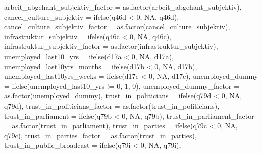 \documentclass[
]{article}
\newenvironment{Shaded}{\begin{snugshade}}{\end{snugshade}}
\newcommand{\AttributeTok}[1]{\textcolor[rgb]{0.77,0.63,0.00}{#1}}
\newcommand{\ConstantTok}[1]{\textcolor[rgb]{0.00,0.00,0.00}{#1}}
\newcommand{\DecValTok}[1]{\textcolor[rgb]{0.00,0.00,0.81}{#1}}
\newcommand{\FunctionTok}[1]{\textcolor[rgb]{0.00,0.00,0.00}{#1}}
\newcommand{\NormalTok}[1]{#1}
\newcommand{\SpecialCharTok}[1]{\textcolor[rgb]{0.00,0.00,0.00}{#1}}
\begin{document}
\begin{Shaded}
\begin{Highlighting}[]
         \AttributeTok{arbeit\_abgehant\_subjektiv\_factor =} \FunctionTok{as.factor}\NormalTok{(arbeit\_abgehant\_subjektiv),}
         \AttributeTok{cancel\_culture\_subjektiv =} \FunctionTok{ifelse}\NormalTok{(q46d }\SpecialCharTok{\textless{}} \DecValTok{0}\NormalTok{, }\ConstantTok{NA}\NormalTok{, q46d),}
         \AttributeTok{cancel\_culture\_subjektiv\_factor =} \FunctionTok{as.factor}\NormalTok{(cancel\_culture\_subjektiv),}
         \AttributeTok{infrastruktur\_subjektiv =} \FunctionTok{ifelse}\NormalTok{(q46c }\SpecialCharTok{\textless{}} \DecValTok{0}\NormalTok{, }\ConstantTok{NA}\NormalTok{, q46c),}
         \AttributeTok{infrastruktur\_subjektiv\_factor =} \FunctionTok{as.factor}\NormalTok{(infrastruktur\_subjektiv),}
         \AttributeTok{unemployed\_last10\_yrs =} \FunctionTok{ifelse}\NormalTok{(d17a }\SpecialCharTok{\textless{}} \DecValTok{0}\NormalTok{, }\ConstantTok{NA}\NormalTok{, d17a),}
         \AttributeTok{unemployed\_last10yrs\_months =} \FunctionTok{ifelse}\NormalTok{(d17b }\SpecialCharTok{\textless{}} \DecValTok{0}\NormalTok{, }\ConstantTok{NA}\NormalTok{, d17b),}
         \AttributeTok{unemployed\_last10yrs\_weeks =} \FunctionTok{ifelse}\NormalTok{(d17c }\SpecialCharTok{\textless{}} \DecValTok{0}\NormalTok{, }\ConstantTok{NA}\NormalTok{, d17c),}
         \AttributeTok{unemployed\_dummy =} \FunctionTok{ifelse}\NormalTok{(unemployed\_last10\_yrs }\SpecialCharTok{!=} \DecValTok{0}\NormalTok{, }\DecValTok{1}\NormalTok{, }\DecValTok{0}\NormalTok{),}
         \AttributeTok{unemployed\_dummy\_factor =} \FunctionTok{as.factor}\NormalTok{(unemployed\_dummy),}
         \AttributeTok{trust\_in\_politicians =} \FunctionTok{ifelse}\NormalTok{(q79d }\SpecialCharTok{\textless{}} \DecValTok{0}\NormalTok{, }\ConstantTok{NA}\NormalTok{, q79d),}
         \AttributeTok{trust\_in\_politicians\_factor =} \FunctionTok{as.factor}\NormalTok{(trust\_in\_politicians),}
         \AttributeTok{trust\_in\_parliament =} \FunctionTok{ifelse}\NormalTok{(q79b }\SpecialCharTok{\textless{}} \DecValTok{0}\NormalTok{, }\ConstantTok{NA}\NormalTok{, q79b),}
         \AttributeTok{trust\_in\_parliament\_factor =} \FunctionTok{as.factor}\NormalTok{(trust\_in\_parliament),}
         \AttributeTok{trust\_in\_parties =} \FunctionTok{ifelse}\NormalTok{(q79c }\SpecialCharTok{\textless{}} \DecValTok{0}\NormalTok{, }\ConstantTok{NA}\NormalTok{, q79c),}
         \AttributeTok{trust\_in\_parties\_factor =} \FunctionTok{as.factor}\NormalTok{(trust\_in\_parties),}
         \AttributeTok{trust\_in\_public\_broadcast =} \FunctionTok{ifelse}\NormalTok{(q79i }\SpecialCharTok{\textless{}} \DecValTok{0}\NormalTok{, }\ConstantTok{NA}\NormalTok{, q79i),}

\end{Highlighting}
\end{Shaded}
\end{document}
